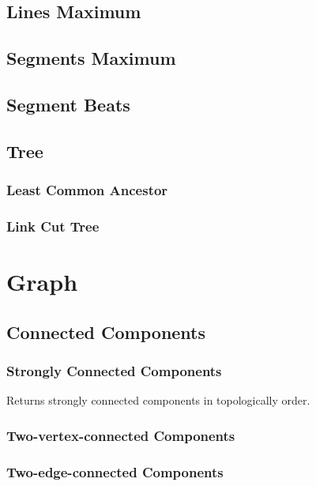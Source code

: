 \documentclass{article}
\begin{document}
\begin{multicols}{2}
    \subsection{Lines Maximum}
    
    \subsection{Segments Maximum}
    
    \subsection{Segment Beats}
    
    \subsection{Tree}
    \subsubsection{Least Common Ancestor}
    
    \subsubsection{Link Cut Tree}
    


    \section{Graph}
    \subsection{Connected Components}
    \subsubsection{Strongly Connected Components}
    Returns strongly connected components in topologically order.
    

    \subsubsection{Two-vertex-connected Components}
    

    \subsubsection{Two-edge-connected Components}
    


\end{multicols}
\end{document}
